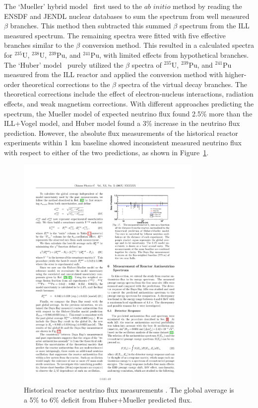     The `Mueller' hybrid model~\cite{bib:mueller} first used to the $\textit{ab initio}$ method by reading the ENSDF and JENDL nuclear databases to sum the \nuebar spectrum from well measured $\beta$ branches.
    This method then subtracted this summed $\beta$ spectrum from the ILL measured spectrum.
    The remaining spectra were fitted with five effective branches similar to the $\beta$ conversion method.
    This resulted in a calculated \nuebar spectra for $^{235}$U, $^{238}$U, $^{239}$Pu, and $^{241}$Pu, with limited effects from hypothetical branches.
    The `Huber' model~\cite{bib:huber} purely utilized the $\beta$ spectra of $^{235}$U, $^{239}$Pu, and $^{241}$Pu measured from the ILL reactor and applied the conversion method with higher-order theoretical corrections to the $\beta$ spectra of the virtual decay branches.
    The theoretical corrections include the effect of electron-nucleus interactions, radiation effects, and weak magnetism corrections. 
    With different approaches predicting the \nuebar spectrum, the Mueller model of expected neutrino flux found 2.5\% more than the ILL+Vogel model, and Huber model found a 3\% increase in the neutrino flux prediction.
    However, the absolute flux measurements of the historical reactor experiments within 1~km baseline showed inconsistent measured neutrino flux with respect to either of the two predictions, as shown in Figure~\ref{fig:DYBFlux}.
    \begin{figure}[h!]
    \centering
    \includegraphics[width=0.8\textwidth]{Figures/DYBGlobalFlux.pdf}
    \caption[Historical Absolute Reactor Neutrino Flux]{Historical reactor neutrino flux measurements \cite{bib:DYB2015}.
    The global average is a 5\% to 6\% deficit from Huber+Mueller predicted flux.}
    \label{fig:DYBFlux}
    \end{figure}
    
